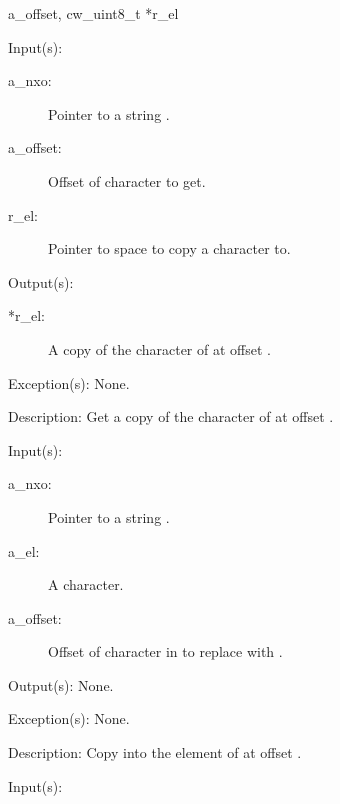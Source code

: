 \begin{capi}
{{a\_offset, cw\_uint8\_t *r\_el}}
	\begin{capilist}
	\item[Input(s): ]
		\begin{description}\item[]
		\item[a\_nxo: ]
			Pointer to a string .
		\item[a\_offset: ]
			Offset of character to get.
		\item[r\_el: ]
			Pointer to space to copy a character to.
		\end{description}
	\item[Output(s): ]
		\begin{description}\item[]
		\item[*r\_el: ]
			A copy of the character of  at offset
			.
		\end{description}
	\item[Exception(s): ] None.
	\item[Description: ]
		Get a copy of the character of  at offset
		.
	\end{capilist}
\label{nxo_string_el_set}
	\begin{capilist}
	\item[Input(s): ]
		\begin{description}\item[]
		\item[a\_nxo: ]
			Pointer to a string \classname{nxo}.
		\item[a\_el: ]
			A character.
		\item[a\_offset: ]
			Offset of character in  to replace with
			\cvar{a\_el}.
		\end{description}
	\item[Output(s): ] None.
	\item[Exception(s): ] None.
	\item[Description: ]
		Copy  into the element of  at offset
		\cvar{a\_offset}.
	\end{capilist}
\label{nxo_string_lock}
	\begin{capilist}
	\item[Input(s): ]

\end{capilist}
\end{capi}

